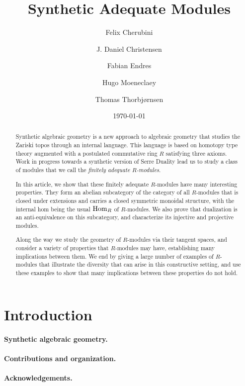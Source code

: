 \documentclass{../util/zariski-small}
\title{Synthetic Adequate Modules}
\author{Felix Cherubini \and J. Daniel Christensen \and Fabian Endres \and Hugo Moeneclaey \and Thomas Thorbjørnsen}
\date{\today}
\begin{document}
\maketitle

\begin{abstract}
  Synthetic algebraic geometry is a new approach to algebraic geometry
  that studies the Zariski topos through an internal language.
  This language is based on homotopy type theory augmented with a
  postulated commutative ring $R$ satisfying three axioms.
  Work in progress towards a synthetic version of Serre Duality
  lead us to study a class of modules that we call the \emph{finitely adequate $R$-modules}.

  In this article, we show that these finitely adequate $R$-modules have many interesting properties.
  They form an abelian subcategory of the category of all $R$-modules
  that is closed under extensions and carries a closed symmetric monoidal structure,
  with the internal hom being the usual $\mathrm{Hom}_R$ of $R$-modules.
  We also prove that dualization is an anti-equivalence on this subcategory,
  and characterize its injective and projective modules.

  Along the way we study the geometry of $R$-modules via their tangent spaces, and consider
  a variety of properties that $R$-modules may have, establishing many implications between them.
  We end by giving a large number of examples of $R$-modules that illustrate the diversity
  that can arise in this constructive setting,
  and use these examples to show that many implications between these properties do not hold.
\end{abstract}

\tableofcontents

\section{Introduction}
\label{intro-section}
\paragraph{Synthetic algebraic geometry.}

\paragraph{Contributions and organization.}

\paragraph{Acknowledgements.}

\end{document}
